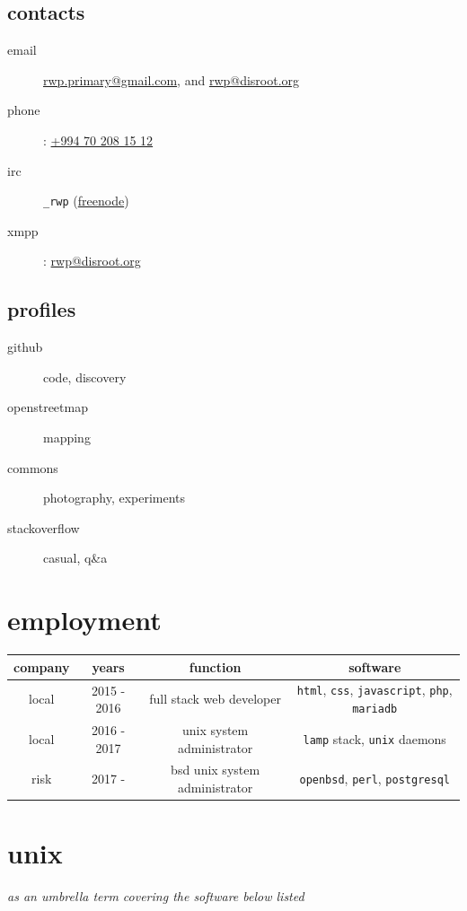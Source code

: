 \documentclass{article}
\begin{document}
     \subsection{contacts}
       \begin{description}
         \item[email] \href{mailto:rwp.primary@gmail.com}{rwp.primary@gmail.com}, and \href{mailto:rwp@disroot.org}{rwp@disroot.org}
         \item[phone]: \href{tel:+994702081512}{+994 70 208 15 12}
         \item[irc] \verb|_rwp| (\href{https://freenode.net/}{freenode})
         \item[xmpp]: \url{rwp@disroot.org}
       \end{description}
     \subsection{profiles}
       \begin{description}
         \item[github] code, discovery
         \item[openstreetmap] mapping
         \item[commons] photography, experiments
         \item[stackoverflow] casual, q\&a
       \end{description}

  \section{employment}
    \begin{tabular}{ c | c | c | c }
      \hline			
      company & years & function & software \\
      \hline  
      local & 2015 - 2016 & full stack web developer & \verb|html|, \verb|css|, \verb|javascript|, \verb|php|, \verb|mariadb| \\
      local & 2016 - 2017 & unix system administrator & \verb|lamp| stack, \verb|unix| daemons \\
      risk & 2017 - & bsd unix system administrator & \verb|openbsd|, \verb|perl|, \verb|postgresql| \\
      \hline  
    \end{tabular}

\section{unix} %
\textit{as an umbrella term covering the software below listed}
\end{document}
